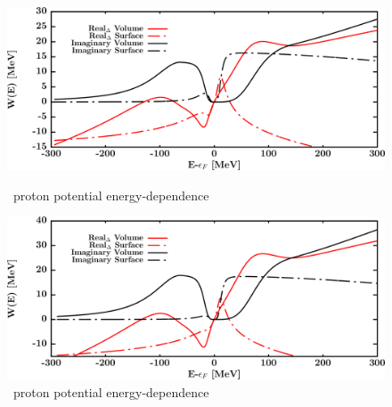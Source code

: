 \begin{figure}[H]
    \centering
    \begin{minipage}{0.45\textwidth}
        \centering
        \includegraphics[width=1.0\textwidth]{figures/ni58_protonPotentials.png}
        \caption{\niEight\ proton potential energy-dependence}
        \label{DOMFitData_ni58_proton_potentialComponent_energy}
    \end{minipage}\hfill
    \begin{minipage}{0.45\textwidth}
        \centering
        \includegraphics[width=1.0\textwidth]{figures/ni58_neutronPotentials.png}
        \caption{\niEight\ proton potential energy-dependence}
        \label{DOMFitData_ni58_neutron_potentialComponent_energy}
    \end{minipage}
\end{figure}

